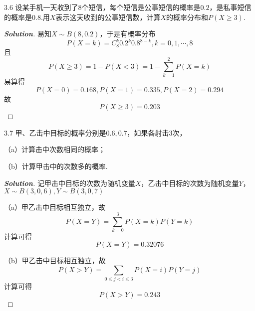 \documentclass[10pt, a4paper, oneside]{ctexart}
\newenvironment{solution}{\begin{proof}[\bf Solution]}{\end{proof}}
\begin{document}
3.6 设某手机一天收到了$8$个短信，每个短信是公事短信的概率是$0.2$，是私事短信的概率是$0.8$.用$X$表示这天收到的公事短信数，计算$X$的概率分布和$P(X\geqslant 3)$.
\begin{solution}
易知$X\sim B(8,0.2)$，于是有概率分布
\[P(X = k) = C_8^k{0.2^k}{0.8^{8 - k}},k = 0,1, \cdots ,8\]
且
\[P(X \geqslant 3) = 1 - P(X < 3) = 1 - \sum\limits_{k = 1}^2 {P(X = k)} \]
易算得
\[P(X = 0) = 0.168,P(X = 1) = 0.335,P(X = 2) = 0.294\]
故
\[P(X \geqslant 3) = 0.203\]
\end{solution}


3.7 甲、乙击中目标的概率分别是$0.6,0.7$，如果各射击$3$次，

（a）计算击中次数相同的概率；

（b）计算甲击中的次数多的概率.
\begin{solution}
记甲击中目标的次数为随机变量$X$，乙击中目标的次数为随机变量$Y$，$X\sim B(3,0,6),Y\sim B(3,0,7)$

（a）甲乙击中目标相互独立，故
\[P(X = Y) = \sum\limits_{k = 0}^3 {P(X = k)P(Y = k)} \]
计算可得
\[P(X = Y) = 0.32076\]

（b）甲乙击中目标相互独立，故
\[P(X > Y) = \sum\limits_{0 \leqslant j < i \leqslant 3} {P(X = i)P(Y = j)} \]
计算可得
\[P(X > Y) = 0.243\]
\end{solution}
\end{document}
